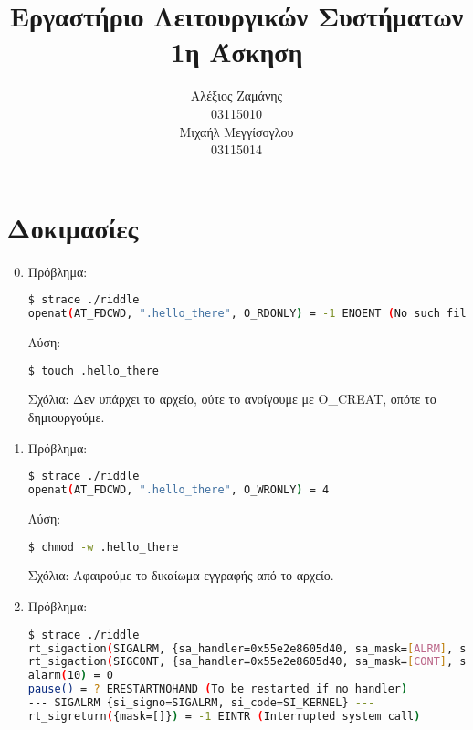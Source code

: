 \documentclass[12pt,titlepage]{article}
\title{Εργαστήριο Λειτουργικών Συστήματων\\
1η Άσκηση}
\author{Αλέξιος Ζαμάνης\\
03115010\\
Μιχαήλ Μεγγίσογλου\\
03115014}
\newcommand{\en}{\textlatin}
\begin{document}
\maketitle

\section{Δοκιμασίες}

\begin{enumerate}

\setcounter{enumi}{-1}

\item

Πρόβλημα:

\latintext
\begin{lstlisting}[language=bash]
$ strace ./riddle
openat(AT_FDCWD, ".hello_there", O_RDONLY) = -1 ENOENT (No such file or directory)
\end{lstlisting}
\greektext

Λύση:

\latintext
\begin{lstlisting}[language=bash]
$ touch .hello_there
\end{lstlisting}
\greektext

Σχόλια: Δεν υπάρχει το αρχείο, ούτε το ανοίγουμε με \en{O_CREAT}, οπότε το δημιουργούμε.

\item

Πρόβλημα:

\latintext
\begin{lstlisting}[language=bash]
$ strace ./riddle
openat(AT_FDCWD, ".hello_there", O_WRONLY) = 4
\end{lstlisting}
\greektext

Λύση:

\latintext
\begin{lstlisting}[language=bash]
$ chmod -w .hello_there
\end{lstlisting}
\greektext

Σχόλια: Αφαιρούμε το δικαίωμα εγγραφής από το αρχείο.

\item

Πρόβλημα:

\latintext
\begin{lstlisting}[language=bash]
$ strace ./riddle
rt_sigaction(SIGALRM, {sa_handler=0x55e2e8605d40, sa_mask=[ALRM], sa_flags=SA_RESTORER|SA_RESTART, sa_restorer=0x7f0e02f31f20}, {sa_handler=SIG_DFL, sa_mask=[], sa_flags=0}, 8) = 0
rt_sigaction(SIGCONT, {sa_handler=0x55e2e8605d40, sa_mask=[CONT], sa_flags=SA_RESTORER|SA_RESTART, sa_restorer=0x7f0e02f31f20}, {sa_handler=SIG_DFL, sa_mask=[], sa_flags=0}, 8) = 0
alarm(10) = 0
pause() = ? ERESTARTNOHAND (To be restarted if no handler)
--- SIGALRM {si_signo=SIGALRM, si_code=SI_KERNEL} ---
rt_sigreturn({mask=[]}) = -1 EINTR (Interrupted system call)


\end{lstlisting}
\end{enumerate}
\end{document}
